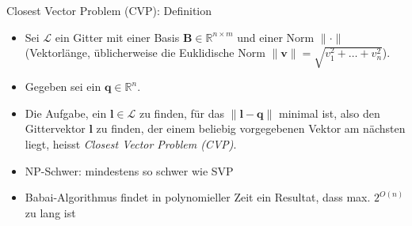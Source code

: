 \begin{frame}{Closest Vector Problem (CVP): Definition}
    \begin{itemize}
        \item Sei $\mathcal{L}$ ein Gitter mit einer Basis $\mathbf{B} \in \mathbb{R}^{n \times m}$ und einer Norm $\|\cdot\|$ (Vektorlänge, üblicherweise die Euklidische Norm $\|\mathbf{v}\| = \sqrt{v_1^2 + \dots + v_n^2}$).
        \item Gegeben sei ein $\mathbf{q} \in \mathbb{R}^n$.
        \item Die Aufgabe, ein $\mathbf{l} \in \mathcal{L}$ zu finden, für das $\|\mathbf{l} - \mathbf{q}\|$ minimal ist, also den Gittervektor $\mathbf{l}$ zu finden, der einem beliebig vorgegebenen Vektor am nächsten liegt, heisst \textit{Closest Vector Problem (CVP)}.
    \end{itemize}
    \vspace{2em}
    {
    \begin{itemize}
        \item NP-Schwer: mindestens so schwer wie SVP
        \item Babai-Algorithmus findet in polynomieller Zeit ein Resultat, dass max. $2^{O(n)}$ zu lang ist
    \end{itemize}
    }
\end{frame}
